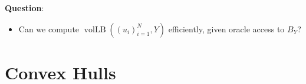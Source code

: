 \documentclass{article}
\newcommand\eps{\varepsilon}
\newcommand{\eqdef}{\triangleq}
\DeclareMathOperator{\vollb}{volLB}
\begin{document}
% 

\medskip\noindent
\textbf{Question}:
\begin{itemize}
\item Can we compute $\vollb((u_i)_{i = 1}^N, Y)$ efficiently, given
  oracle access to $B_Y$?
\end{itemize}

\section{Convex Hulls}
\end{document}
